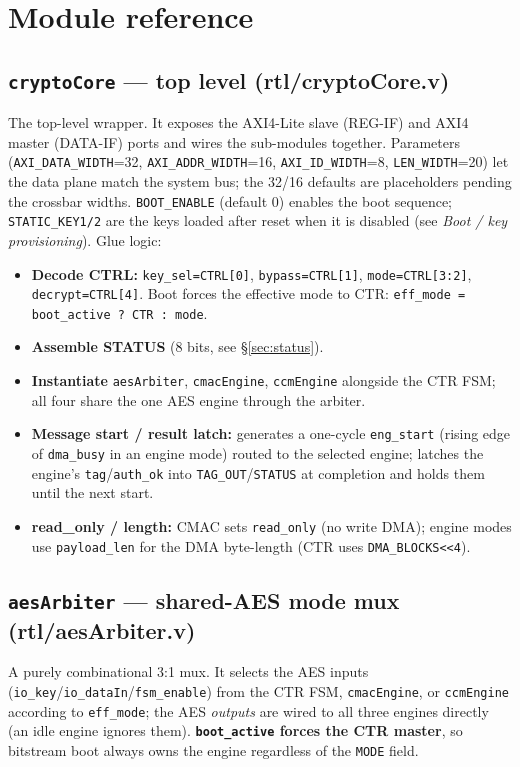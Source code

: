 \documentclass[11pt,a4paper]{article}
\newcommand{\reg}[1]{\texttt{#1}}
\newcommand{\bit}[1]{\texttt{#1}}
\begin{document}
\section{Module reference}

\subsection{\texttt{cryptoCore} --- top level (rtl/cryptoCore.v)}
The top-level wrapper. It exposes the AXI4-Lite slave (REG-IF) and AXI4 master (DATA-IF)
ports and wires the sub-modules together. Parameters (\texttt{AXI\_DATA\_WIDTH}=32,
\texttt{AXI\_ADDR\_WIDTH}=16, \texttt{AXI\_ID\_WIDTH}=8, \texttt{LEN\_WIDTH}=20) let the data
plane match the system bus; the 32/16 defaults are placeholders pending the crossbar widths.
\texttt{BOOT\_ENABLE} (default 0) enables the boot sequence; \texttt{STATIC\_KEY1/2} are the
keys loaded after reset when it is disabled (see \emph{Boot / key provisioning}).
Glue logic:
\begin{itemize}[nosep]
  \item \textbf{Decode CTRL:} \texttt{key\_sel=CTRL[0]}, \texttt{bypass=CTRL[1]},
        \texttt{mode=CTRL[3:2]}, \texttt{decrypt=CTRL[4]}. Boot forces the effective mode to
        CTR: \texttt{eff\_mode = boot\_active ? CTR : mode}.
  \item \textbf{Assemble STATUS} (8 bits, see \S\ref{sec:status}).
  \item \textbf{Instantiate} \reg{aesArbiter}, \reg{cmacEngine}, \reg{ccmEngine} alongside the
        CTR FSM; all four share the one AES engine through the arbiter.
  \item \textbf{Message start / result latch:} generates a one-cycle \texttt{eng\_start} (rising
        edge of \texttt{dma\_busy} in an engine mode) routed to the selected engine; latches the
        engine's \texttt{tag}/\texttt{auth\_ok} into \reg{TAG\_OUT}/\bit{STATUS} at completion
        and holds them until the next start.
  \item \textbf{read\_only / length:} CMAC sets \texttt{read\_only} (no write DMA); engine modes
        use \texttt{payload\_len} for the DMA byte-length (CTR uses \texttt{DMA\_BLOCKS<<4}).
\end{itemize}

\subsection{\texttt{aesArbiter} --- shared-AES mode mux (rtl/aesArbiter.v)}
A purely combinational 3:1 mux. It selects the AES inputs
(\texttt{io\_key}/\texttt{io\_dataIn}/\texttt{fsm\_enable}) from the CTR FSM, \reg{cmacEngine},
or \reg{ccmEngine} according to \texttt{eff\_mode}; the AES \emph{outputs} are wired to all
three engines directly (an idle engine ignores them). \textbf{\texttt{boot\_active} forces the
CTR master}, so bitstream boot always owns the engine regardless of the \bit{MODE} field.
\end{document}
